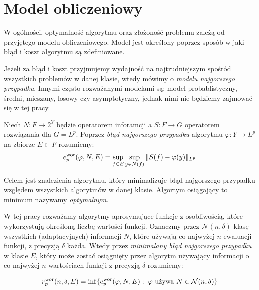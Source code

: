 \documentclass[oik, pdftex, man]{mgrwms}
\begin{document}


\section{Model obliczeniowy}


    W ogólności, optymalność algorytmu oraz złożoność problemu zależą od przyjętego modelu obliczeniowego. Model jest określony poprzez sposób w jaki błąd i koszt algorytmu są zdefiniowane. 
    
    Jeżeli za błąd i koszt przyjmujemy wydajność na najtrudniejszym spośród wszystkich problemów w danej klasie, wtedy mówimy o \textit{modelu najgorszego przypadku}. Innymi często rozważanymi modelami są: model probablistyczny, średni, mieszany, losowy czy asymptotyczny, jednak nimi nie będziemy zajmować się w tej pracy.

    Niech $N : F \rightarrow 2^{Y}$ będzie operatorem inforamcji a $S: F \rightarrow G$ operatorem rozwiązania dla $G=L^{p}$. Poprzez \textit{błąd najgorszego przypadku} algorytmu $\varphi : Y \rightarrow L^{p}$ na zbiorze $E \subset F$ rozumiemy:
    \begin{equation*}
        e_{p}^{\mathrm{wor}}(\varphi, N, E) = \sup_{f \in E} \sup_{y \in N(f)} \|S(f) - \varphi(y) \|_{L^{p}}
    \end{equation*}

    Celem jest znalezienia algorytmu, który minimalizuje błąd najgorszego przypadku względem wszystkich algorytmów w danej klasie. Algortym osiągający to minimum nazywamy \textit{optymalnym}.

    W tej pracy rozważamy algorytmy aprosymujące funkcje z osobliwością, które wykorzystują określoną liczbę wartości funkcji. Oznaczmy przez $\mathcal{N}(n, \delta)$ klasę wszystkich (adaptacyjnych) informacji $N$, które używają co najwyżej $n$ ewaluacji funkcji, z precyzją $\delta$ każda. Wtedy przez \textit{minimalany błąd najgorszego przypadku} w klasie $E$, który może zostać osiągnięty przez algorytm używający informacji o co najwyżej $n$ wartościach funkcji z precyzją $\delta$ rozumiemy:

    \begin{equation*}
        r^{\mathrm{wor}}_{p}(n, \delta, E) = \inf\{ e_{p}^{\mathrm{wor}}(\varphi, N, E) : \; \varphi \text{ używa } N \in \mathcal{N}(n, \delta) \}
    \end{equation*}
\end{document}
